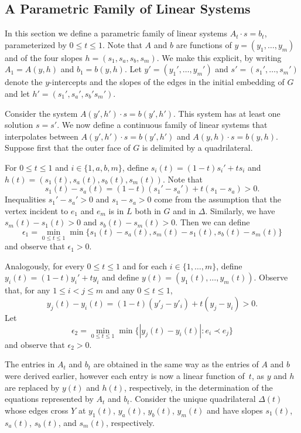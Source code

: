 
\subsection{A Parametric Family of Linear Systems}

In this section we define a parametric family of linear systems
$A_t\cdot s = b_t$, parameterized by $0\le t\le 1$. Note that $A$
and $b$ are functions of $y=(y_1,\ldots,y_m)$ and of the four slopes
$h=(s_1,s_a,s_b,s_m)$. We make this explicit, by writing $A_1=A(y,h)$
and $b_1=b(y,h)$. 
Let $y'=(y_1',\ldots,y_m')$ and $s'=(s_1',\ldots,s_m')$ denote the
$y$-intercepts and the slopes of the edges in the initial embedding of $G$
and let $h'=(s_1',s_a',s_b's_m')$. 

Consider the system $A(y',h')\cdot s = b(y',h')$.  This system has
at least one solution $s=s'$.  We now define
a continuous family of linear systems that interpolates between $A(y',h')\cdot s=b(y',h')$ and $A(y,h)\cdot s=b(y,h)$. Suppose first that the outer face of $G$ is delimited by a quadrilateral.

For $0\le t\le 1$ and $i\in\{1,a,b,m\}$,  define $s_i(t)=(1-t)s_i' + ts_i$ and $h(t)=(s_1(t),s_a(t),s_b(t),s_m(t))$.
Note that
\[  
s_1(t)-s_a(t) = (1-t)(s_1'-s_a') + t(s_1-s_a) > 0. 
\]
Inequalities $s_1'-s_a'>0$ and $s_1-s_a>0$ come from the assumption that the vertex incident to  $e_1$ and $e_m$ is in $L$ both in $G$ and in $\Delta$. Similarly, we have $s_m(t)-s_1(t)>0$ and $s_b(t)-s_m(t)>0$. Then we can define \[
\epsilon_1 = \min_{0\le t\le 1}\min\{s_1(t)-s_a(t), s_m(t)-s_1(t), s_b(t)-s_m(t)\}
\]
and observe that $\epsilon_1>0$.

Analogously, for every $0\le t\le 1$ and for each $i\in\{1,\ldots,m\}$, define $y_i(t) = (1-t)y_i' + ty_i$ and define $y(t)=(y_1(t),\ldots,y_m(t))$.
Observe that, for any
$1\le i< j\le m$ and any $0\le t\le 1$,
\[
y_j(t) - y_i(t) = (1-t)(y'_j-y'_i) + t(y_j-y_i) > 0.
\]
Let 
\[    \epsilon_2=\min_{0\le t\le 1}\min\{|y_j(t)-y_i(t)|: e_i\prec e_j\}
\]
and observe that $\epsilon_2 >0$.  

The entries in $A_t$ and $b_t$ are obtained in the same way as the entries of $A$ and $b$ were derived earlier, however each entry is now a linear function of~$t$, as $y$ and $h$ are replaced by $y(t)$ and $h(t)$, respectively, in the determination of the equations represented by $A_t$ and $b_t$.
Consider the unique quadrilateral $\Delta(t)$ whose edges cross $Y$ at
$y_1(t)$, $y_a(t)$, $y_b(t)$, $y_m(t)$ and have slopes $s_1(t)$,
$s_a(t)$, $s_b(t)$, and $s_m(t)$, respectively. 

